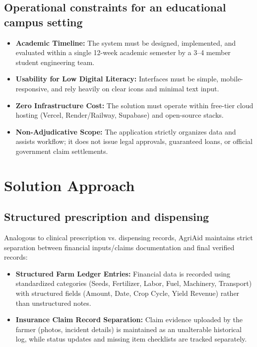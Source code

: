 \documentclass[11pt,a4paper]{article}
\begin{document}
\subsection{Operational constraints for an educational campus setting}
\begin{itemize}[leftmargin=*]
    \item \textbf{Academic Timeline:} The system must be designed, implemented, and evaluated within a single 12-week academic semester by a 3–4 member student engineering team.
    \item \textbf{Usability for Low Digital Literacy:} Interfaces must be simple, mobile-responsive, and rely heavily on clear icons and minimal text input.
    \item \textbf{Zero Infrastructure Cost:} The solution must operate within free-tier cloud hosting (Vercel, Render/Railway, Supabase) and open-source stacks.
    \item \textbf{Non-Adjudicative Scope:} The application strictly organizes data and assists workflow; it does not issue legal approvals, guaranteed loans, or official government claim settlements.
\end{itemize}

\section{Solution Approach}

\subsection{Structured prescription and dispensing}
Analogous to clinical prescription vs. dispensing records, AgriAid maintains strict separation between financial inputs/claims documentation and final verified records:
\begin{itemize}[leftmargin=*]
    \item \textbf{Structured Farm Ledger Entries:} Financial data is recorded using standardized categories (Seeds, Fertilizer, Labor, Fuel, Machinery, Transport) with structured fields (Amount, Date, Crop Cycle, Yield Revenue) rather than unstructured notes.
    \item \textbf{Insurance Claim Record Separation:} Claim evidence uploaded by the farmer (photos, incident details) is maintained as an unalterable historical log, while status updates and missing item checklists are tracked separately.
\end{itemize}
\end{document}
